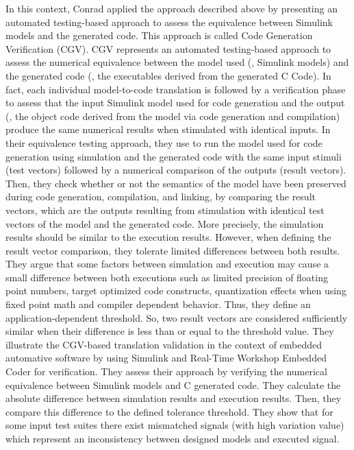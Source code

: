 In this context, Conrad \etal\cite{conrad2010code} applied the approach described above by presenting an automated testing-based approach to assess the equivalence between Simulink models and the generated code. This approach is called Code Generation Verification (CGV).
CGV represents an automated testing-based approach to assess the numerical equivalence between the model used (\ie, Simulink models) and the generated code (\ie, the executables derived from the generated C Code). 
In fact, each individual model-to-code translation is followed by a verification phase to assess that the input Simulink model used for code generation and the output (\ie, the object code derived from the model via code generation and compilation) produce the same numerical results when stimulated with identical inputs. 
In their equivalence testing approach, they use to run the model used for code generation using simulation and the generated code with the same input stimuli (test vectors) followed by a numerical comparison of the outputs (result vectors).
Then, they check whether or not the semantics of the model have been preserved during code generation, compilation, and linking, by comparing the result vectors, which are the outputs resulting from stimulation with identical test vectors of the model and the generated code.
More precisely, the simulation results should be similar to the execution results. However, when defining the result vector comparison, they tolerate limited differences between both results. They argue that some factors between simulation and execution may cause a small difference between both executions such as limited precision of floating point numbers, target optimized code constructs, quantization effects when using fixed point math and compiler dependent behavior. 
Thus, they define an application-dependent threshold. So, two result vectors are considered sufficiently similar when their difference is less than or equal to the threshold value.
They illustrate the CGV-based translation validation in the context of embedded automative software by using Simulink and Real-Time Workshop Embedded Coder for verification. They assess their approach by verifying the numerical equivalence between Simulink models and C generated code. They calculate the absolute difference between simulation results and execution results. Then, they compare this difference to the defined tolerance threshold. They show that for some input test suites there exist mismatched signals (with high variation value) which represent an inconsistency between designed models and executed signal.

